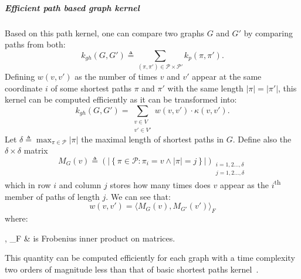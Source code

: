                 \subparagraph{Efficient path based graph kernel}
                    Based on this path kernel, one can compare two graphs \(G\) and \(G'\) by comparing paths from both:
                    \begin{equation}
                        \label{eq::graph_hopper_kernel}
                        k_{gh}(G, G') \triangleq \sum_{(\pi, \pi') \in \mathscr{P} \times \mathscr{P}'} k_p(\pi, \pi').
                    \end{equation}
                    Defining \(w(v, v')\) as the number of times \(v\) and \(v'\) appear at the same coordinate \(i\) of some shortest paths \(\pi\) and \(\pi'\) with the same length \(\vert \pi \vert = \vert \pi' \vert\), this kernel can be computed efficiently as it can be transformed into:
                    \begin{equation}
                        \label{eq::graph_hopper_kernel_second}
                        k_{gh}(G, G') = \sum_{\substack{v \in V\\v' \in V'}} w(v, v')\cdot \kappa(v, v').
                    \end{equation}
                    Let \(\delta \triangleq \max_{\pi \in \mathscr{P}} \vert \pi \vert\) the maximal length of shortest paths in \(G\).
                    Define also the \(\delta \times \delta\) matrix
                    \begin{equation*}
                        M_G(v) \triangleq \left(\left\lvert\left\{\pi \in \mathscr{P}: \pi_i = v \wedge \left\lvert\pi\right\rvert = j \right\}\right\rvert\right)_{\substack{i=1,2\dots,\delta\\j=1,2\dots,\delta}}
                    \end{equation*}
                    which in row \(i\) and column \(j\) stores how many times does \(v\) appear as the \(i\)\textsuperscript{th} member of paths of length \(j\).
                    We can see that:
                    \begin{equation}
                        \label{eq::w_as_matrix_inner_product}
                        w(v, v') = \langle M_G(v), M_{G'}(v')\rangle_F
                    \end{equation}
                    where:
                    \begin{conditions}
                        \langle \bullet, \bullet \rangle_F & is Frobenius inner product on matrices.
                    \end{conditions}
                    This quantity can be computed efficiently for each graph with a time complexity two orders of magnitude less than that of basic shortest paths kernel~\parencite{feragen2013scalable}.
